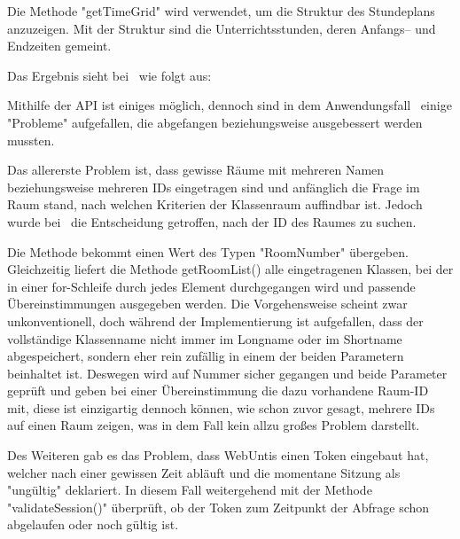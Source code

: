 
\begin{minipage}\textwidth
    Die Methode "getTimeGrid" wird verwendet, um die Struktur des Stundeplans anzuzeigen. Mit der Struktur sind die Unterrichtsstunden, deren Anfangs– und Endzeiten gemeint.


Das Ergebnis sieht bei \ZELIA\ wie folgt aus:


\end{minipage}

\pagebreak
{}

Mithilfe der API ist einiges möglich, dennoch sind in dem Anwendungsfall \ZELIA\ einige "Probleme" aufgefallen, die abgefangen beziehungsweise ausgebessert werden mussten.

Das allererste Problem ist, dass gewisse Räume mit mehreren Namen beziehungsweise mehreren IDs eingetragen sind und anfänglich die Frage im Raum stand, nach welchen Kriterien der Klassenraum auffindbar ist. Jedoch wurde bei \ZELIA\ die Entscheidung getroffen, nach der ID des Raumes zu suchen.



Die Methode bekommt einen Wert des Typen "RoomNumber" übergeben. Gleichzeitig liefert die Methode getRoomList() alle eingetragenen Klassen, bei der in einer for-Schleife durch jedes Element durchgegangen wird und passende Übereinstimmungen ausgegeben werden. Die Vorgehensweise scheint zwar unkonventionell, doch während der Implementierung ist aufgefallen, dass der vollständige Klassenname nicht immer im Longname oder im Shortname abgespeichert, sondern eher rein zufällig in einem der beiden Parametern beinhaltet ist. Deswegen wird auf Nummer sicher gegangen und beide Parameter geprüft und geben bei einer Übereinstimmung die dazu vorhandene Raum-ID mit, diese ist einzigartig dennoch können, wie schon zuvor gesagt, mehrere IDs auf einen Raum zeigen, was in dem Fall kein allzu großes Problem darstellt.

Des Weiteren gab es das Problem, dass WebUntis einen Token eingebaut hat, welcher nach einer gewissen Zeit abläuft und die momentane Sitzung als "ungültig" deklariert. In diesem Fall weitergehend mit der Methode "validateSession()" überprüft, ob der Token zum Zeitpunkt der Abfrage schon abgelaufen oder noch gültig ist. 

